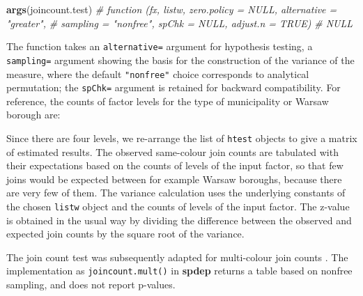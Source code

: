 \documentclass[]{book}
\newenvironment{Shaded}{\begin{snugshade}}{\end{snugshade}}
\newcommand{\CommentTok}[1]{\textcolor[rgb]{0.56,0.35,0.01}{\textit{#1}}}
\newcommand{\DataTypeTok}[1]{\textcolor[rgb]{0.13,0.29,0.53}{#1}}
\newcommand{\KeywordTok}[1]{\textcolor[rgb]{0.13,0.29,0.53}{\textbf{#1}}}
\newcommand{\NormalTok}[1]{#1}
\newcommand{\OperatorTok}[1]{\textcolor[rgb]{0.81,0.36,0.00}{\textbf{#1}}}
\newcommand{\OtherTok}[1]{\textcolor[rgb]{0.56,0.35,0.01}{#1}}
\newcommand{\StringTok}[1]{\textcolor[rgb]{0.31,0.60,0.02}{#1}}
\begin{document}
\begin{Shaded}
\begin{Highlighting}[]
\KeywordTok{args}\NormalTok{(joincount.test)}
\CommentTok{# function (fx, listw, zero.policy = NULL, alternative = "greater", }
\CommentTok{#     sampling = "nonfree", spChk = NULL, adjust.n = TRUE) }
\CommentTok{# NULL}
\end{Highlighting}
\end{Shaded}

The function takes an \texttt{alternative=} argument for hypothesis testing, a \texttt{sampling=} argument showing the basis for the construction of the variance of the measure, where the default \texttt{"nonfree"} choice corresponds to analytical permutation; the \texttt{spChk=} argument is retained for backward compatibility. For reference, the counts of factor levels for the type of municipality or Warsaw borough are:

\begin{Shaded}
\end{Shaded}

Since there are four levels, we re-arrange the list of \texttt{htest} objects to give a matrix of estimated results. The observed same-colour join counts are tabulated with their expectations based on the counts of levels of the input factor, so that few joins would be expected between for example Warsaw boroughs, because there are very few of them. The variance calculation uses the underlying constants of the chosen \texttt{listw} object and the counts of levels of the input factor. The z-value is obtained in the usual way by dividing the difference between the observed and expected join counts by the square root of the variance.

The join count test was subsequently adapted for multi-colour join counts \citep{upton+fingleton:85}. The implementation as \texttt{joincount.mult()} in \textbf{spdep} returns a table based on nonfree sampling, and does not report p-values.
\end{document}
